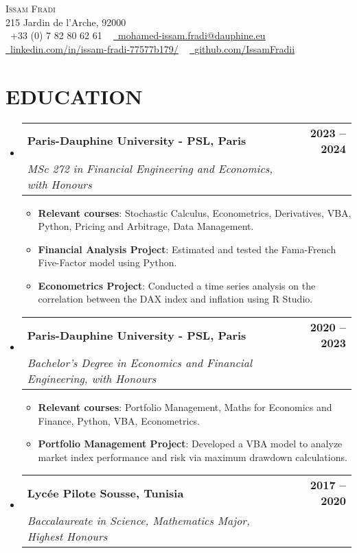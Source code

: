 \documentclass[letterpaper,11pt]{article}
\makeatletter
\newcommand{\resumeItem}[1]{
  \item\small{
    {#1 \vspace{-2pt}}
  }
}
\newcommand{\resumeSubheading}[4]{
  \vspace{-2pt}\item
    \begin{tabular*}{1.0\textwidth}[t]{l@{\extracolsep{\fill}}r}
      \textbf{#1} & \textbf{\small #2} \\
      \textit{\small#3} & \textit{\small #4} \\
    \end{tabular*}\vspace{-7pt}
}
\newcommand{\resumeSubHeadingListStart}{\begin{itemize}[leftmargin=0.0in, label={}]}
\newcommand{\resumeSubHeadingListEnd}{\end{itemize}}
\newcommand{\resumeItemListStart}{\begin{itemize}}
\newcommand{\resumeItemListEnd}{\end{itemize}\vspace{-5pt}}
\makeatother
\begin{document}


\begin{center}
    {\Huge \scshape Issam Fradi} \\ \vspace{1pt}
    215 Jardin de l'Arche, 92000 \\ \vspace{1pt}
    \small \raisebox{-0.1\height}\faPhone\ +33 (0) 7 82 80 62 61  ~ \href{mailto:x@gmail.com}{\raisebox{-0.2\height}\faEnvelope\  \underline{mohamed-issam.fradi@dauphine.eu}} ~ 
    \href{https://linkedin.com/in//}{\raisebox{-0.2\height}\faLinkedin\ \underline{linkedin.com/in/issam-fradi-77577b179/}}  ~
    \href{https://github.com/}{\raisebox{-0.2\height}\faGithub\ \underline{github.com/IssamFradii}}
\end{center}


\section{EDUCATION}
  \resumeSubHeadingListStart
  
    \resumeSubheading
      {Paris-Dauphine University - PSL, Paris}{2023 -- 2024}
      {MSc 272 in Financial Engineering and Economics, with Honours}{}
      \resumeItemListStart
        \resumeItem{\textbf{Relevant courses}: Stochastic Calculus, Econometrics, Derivatives, VBA, Python, Pricing and Arbitrage, Data Management.}
        \resumeItem{\textbf{Financial Analysis Project}: Estimated and tested the Fama-French Five-Factor model using Python.}
        \resumeItem{\textbf{Econometrics Project}: Conducted a time series analysis on the correlation between the DAX index and inflation using R Studio.}
      \resumeItemListEnd
      
    \resumeSubheading
      {Paris-Dauphine University - PSL, Paris}{2020 -- 2023}
      {Bachelor’s Degree in Economics and Financial Engineering, with Honours}{}
      \resumeItemListStart
        \resumeItem{\textbf{Relevant courses}: Portfolio Management, Maths for Economics and Finance, Python, VBA, Econometrics.}
        \resumeItem{\textbf{Portfolio Management Project}: Developed a VBA model to analyze market index performance and risk via maximum drawdown calculations.}
      \resumeItemListEnd

    \resumeSubheading
      {Lycée Pilote Sousse, Tunisia}{2017 -- 2020}
      {Baccalaureate in Science, Mathematics Major, Highest Honours}{}
  
  \resumeSubHeadingListEnd
\end{document}
